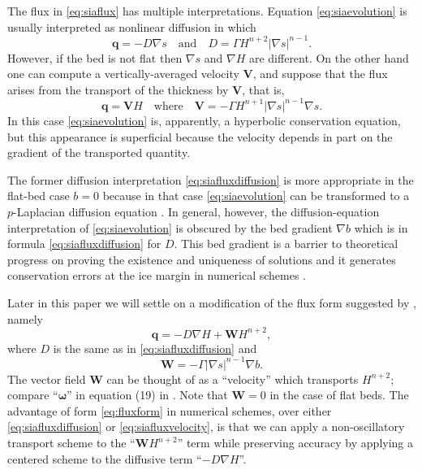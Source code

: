 \documentclass[twocolumn,letterpaper]{igs}
\newcommand\bq{\mathbf{q}}
\newcommand\bV{\mathbf{V}}
\newcommand\bW{\mathbf{W}}
\newcommand{\grad}{\nabla}
\begin{document}
The flux in \eqref{eq:siaflux} has multiple interpretations.  Equation \eqref{eq:siaevolution} is usually interpreted as nonlinear diffusion in which
\begin{equation}
\bq = - D \grad s \quad \text{and} \quad D =  \Gamma H^{n+2} |\grad s|^{n-1}. \label{eq:siafluxdiffusion}
\end{equation}
However, if the bed is not flat then $\grad s$ and $\grad H$ are different.  On the other hand one can compute a vertically-averaged velocity $\bV$, and suppose that the flux arises from the transport of the thickness by $\bV$, that is,
\begin{equation}
\bq = \bV H \quad \text{where} \quad \bV = - \Gamma H^{n+1} |\grad s|^{n-1} \grad s. \label{eq:siafluxvelocity}
\end{equation}
In this case \eqref{eq:siaevolution} is, apparently, a hyperbolic conservation equation, but this appearance is superficial because the velocity depends in part on the gradient of the transported quantity.

The former diffusion interpretation \eqref{eq:siafluxdiffusion} is more appropriate in the flat-bed case $b=0$ because in that case \eqref{eq:siaevolution} can be transformed to a $p$-Laplacian diffusion equation \citep{Calvoetal2002}.  In general, however, the diffusion-equation interpretation of \eqref{eq:siaevolution} is obscured by the bed gradient $\grad b$ which is in formula \eqref{eq:siafluxdiffusion} for $D$.  This bed gradient is a barrier to theoretical progress on proving the existence and uniqueness of solutions \citep{JouvetBueler2012} and it generates conservation errors at the ice margin in numerical schemes \citep{JaroschSchoofAnslow2013}.

Later in this paper we will settle on a modification of the flux form suggested by \cite{JaroschSchoofAnslow2013}, namely
\begin{equation}
\bq = - D \grad H + \bW H^{n+2},\label{eq:fluxform}
\end{equation}
where $D$ is the same as in \eqref{eq:siafluxdiffusion} and
\begin{equation}
\bW = - \Gamma |\grad s|^{n-1} \grad b.  \label{eq:siaWdefine}
\end{equation}
The vector field $\bW$ can be thought of as a ``velocity'' which transports $H^{n+2}$; compare ``$\boldsymbol{\omega}$'' in equation (19) in \citep{JaroschSchoofAnslow2013}.  Note that $\bW=0$ in the case of flat beds.  The advantage of form \eqref{eq:fluxform} in numerical schemes, over either \eqref{eq:siafluxdiffusion} or \eqref{eq:siafluxvelocity}, is that we can apply a non-oscillatory transport scheme to the ``$\bW H^{n+2}$'' term while preserving accuracy by applying a centered scheme to the diffusive term ``$-D \grad H$''.
\end{document}
